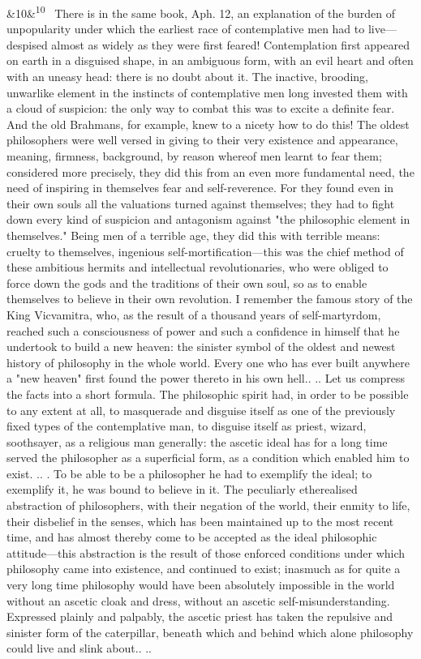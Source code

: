 \documentclass[12pt]{article}
\newcommand{\para}[1][]{\par\noindent\ifx&#1&\else\textsuperscript{\footnotesize #1}~\fi}
\begin{document}
\para[10] There is in the same book, Aph. 12, an explanation of the burden of unpopularity under which the earliest race of contemplative men had to live---despised almost as widely as they were first feared! Contemplation first appeared on earth in a disguised shape, in an ambiguous form, with an evil heart and often with an uneasy head: there is no doubt about it. The inactive, brooding, unwarlike element in the instincts of contemplative men long invested them with a cloud of suspicion: the only way to combat this was to excite a definite fear. And the old Brahmans, for example, knew to a nicety how to do this! The oldest philosophers were well versed in giving to their very existence and appearance, meaning, firmness, background, by reason whereof men learnt to fear them; considered more precisely, they did this from an even more fundamental need, the need of inspiring in themselves fear and self-reverence. For they found even in their own souls all the valuations turned against themselves; they had to fight down every kind of suspicion and antagonism against "the philosophic element in themselves." Being men of a terrible age, they did this with terrible means: cruelty to themselves, ingenious self-mortification---this was the chief method of these ambitious hermits and intellectual revolutionaries, who were obliged to force down the gods and the traditions of their own soul, so as to enable themselves to believe in their own revolution. I remember the famous story of the King Vicvamitra, who, as the result of a thousand years of self-martyrdom, reached such a consciousness of power and such a confidence in himself that he undertook to build a new heaven: the sinister symbol of the oldest and newest history of philosophy in the whole world. Every one who has ever built anywhere a "new heaven" first found the power thereto in his own hell.. .. Let us compress the facts into a short formula. The philosophic spirit had, in order to be possible to any extent at all, to masquerade and disguise itself as one of the previously fixed types of the contemplative man, to disguise itself as priest, wizard, soothsayer, as a religious man generally: the ascetic ideal has for a long time served the philosopher as a superficial form, as a condition which enabled him to exist. .. . To be able to be a philosopher he had to exemplify the ideal; to exemplify it, he was bound to believe in it. The peculiarly etherealised abstraction of philosophers, with their negation of the world, their enmity to life, their disbelief in the senses, which has been maintained up to the most recent time, and has almost thereby come to be accepted as the ideal philosophic attitude---this abstraction is the result of those enforced conditions under which philosophy came into existence, and continued to exist; inasmuch as for quite a very long time philosophy would have been absolutely impossible in the world without an ascetic cloak and dress, without an ascetic self-misunderstanding. Expressed plainly and palpably, the ascetic priest has taken the repulsive and sinister form of the caterpillar, beneath which and behind which alone philosophy could live and slink about.. ..
\end{document}
